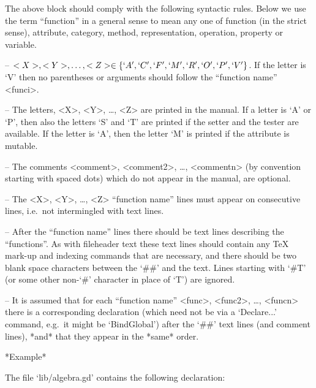 The above block should comply with the following syntactic  rules.  Below
we use the term ``function'' in a  general  sense  to  mean  any  one  of
function  (in   the   strict   sense),   attribute,   category,   method,
representation, operation, property or variable.

\beginlist%

\item{--}
$<X>, <Y>, \dots, <Z> \in \{ `A', `C', `F', `M', `R', `O', `P', `V'  \}$.
If the letter is `V' then no parentheses or arguments should  follow  the
``function name'' <funci>.

\item{--} 
The letters, <X>, <Y>, \dots, <Z> are printed in the manual. If a  letter
is `A' or `P', then also the letters `S'  and  `T'  are  printed  if  the
setter and the tester are available. If  the  letter  is  `A',  then  the
letter `M' is printed if the attribute is mutable.

\item{--}
The comments <comment>,  <comment2>,  \dots,  <commentn>  (by  convention
starting with spaced dots)  which  do  not  appear  in  the  manual,  are
optional.

\item{--}
The  <X>,  <Y>,  \dots,  <Z>  ``function  name''  lines  must  appear  on
consecutive lines, i.e.~not intermingled with text lines.

\item{--}
After the ``function name'' lines there should be text  lines  describing
the ``functions''. As  with  fileheader  text  these  text  lines  should
contain any {\TeX} mark-up and indexing commands that are necessary,  and
there should be two blank space characters between  the  `\#\#'  and  the
text. Lines starting with `\#T' (or  some  other  non-`\#'  character  in
place of `T') are ignored.

\item{--} 
It is assumed that for each ``function  name''  <func>,  <func2>,  \dots,
<funcn> there is a corresponding {\GAP} declaration (which  need  not  be
via a `Declare...' command, e.g.~it  might  be  `BindGlobal')  after  the
`\#\#' text lines (and comment lines), *and*  that  they  appear  in  the
*same* order.

\endlist

\goodbreak%

*Example*

The file `lib/algebra.gd' contains the following declaration:

